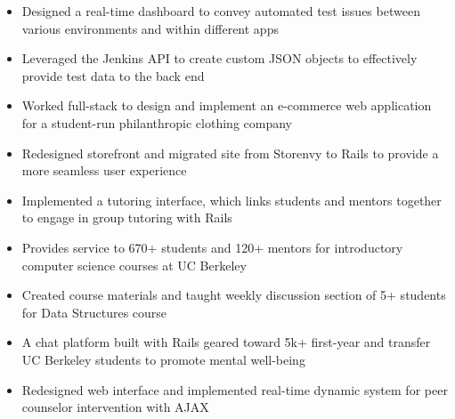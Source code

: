 \documentclass{resume}
\begin{document}
\begin{itemize}
\item Designed a real-time dashboard to convey automated test issues between various environments and within different apps
\item Leveraged the Jenkins API to create custom JSON objects to effectively provide test data to the back end
\end{itemize}
\begin{itemize}
\item Worked full-stack to design and implement an e-commerce web application for a student-run philanthropic clothing company
\item Redesigned storefront and migrated site from Storenvy to Rails to provide a more seamless user experience
\end{itemize}
\begin{itemize}
\item Implemented a tutoring interface, which links students and mentors together to engage in group tutoring with Rails
\item Provides service to 670+ students and 120+ mentors for introductory computer science courses at UC Berkeley
\item Created course materials and taught weekly discussion section of 5+ students for Data Structures course
\end{itemize}
\begin{itemize}
\item A chat platform built with Rails geared toward 5k+ first-year and transfer UC Berkeley students to promote mental well-being
\item Redesigned web interface and implemented real-time dynamic system for peer counselor intervention with AJAX
\end{itemize}

\end{document}
